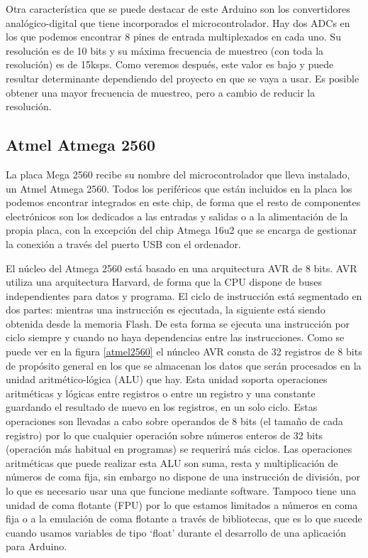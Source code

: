 Otra característica que se puede destacar de este Arduino son los convertidores analógico-digital que tiene incorporados el microcontrolador. Hay dos ADCs en los que podemos encontrar 8 pines de entrada multiplexados en cada uno. Su resolución es de 10 bits y su máxima frecuencia de muestreo (con toda la resolución) es de 15ksps. Como veremos después, este valor es bajo y puede resultar determinante dependiendo del proyecto en que se vaya a usar. Es posible obtener una mayor frecuencia de muestreo, pero a cambio de reducir la resolución.

\subsection*{ Atmel Atmega 2560}
La placa Mega 2560 recibe su nombre del microcontrolador que lleva instalado, un Atmel Atmega 2560. Todos los periféricos que están incluidos en la placa los podemos encontrar integrados en este chip, de forma que el resto de componentes electrónicos son los dedicados a las entradas y salidas o a la alimentación de la propia placa, con la excepción del chip Atmega 16u2 que se encarga de gestionar la conexión a través del puerto USB con el ordenador.

El núcleo del Atmega 2560 está basado en una arquitectura AVR de 8 bits. AVR utiliza una arquitectura Harvard, de forma que la CPU dispone de buses independientes para datos y programa. El ciclo de instrucción está segmentado en dos partes: mientras una instrucción es ejecutada, la siguiente está siendo obtenida desde la memoria Flash. De esta forma se ejecuta una instrucción por ciclo siempre y cuando no haya dependencias entre las instrucciones.
Como se puede ver en la figura \ref{atmel2560} el núncleo AVR consta de 32 registros de 8 bits de propósito general en los que se almacenan los datos que serán procesados en la unidad aritmético-lógica (ALU) que hay. Esta unidad soporta operaciones aritméticas y lógicas entre registros o entre un registro y una constante guardando el resultado de nuevo en los registros, en un solo ciclo. Estas operaciones son llevadas a cabo sobre operandos de 8 bits (el tamaño de cada registro) por lo que cualquier operación sobre números enteros de 32 bits (operación más habitual en programas) se requerirá más ciclos. Las operaciones aritméticas que puede realizar esta ALU son suma, resta y multiplicación de números de coma fija, sin embargo no dispone de una instrucción de división, por lo que es necesario usar una que funcione mediante software. Tampoco tiene una unidad de coma flotante (FPU) por lo que estamos limitados a números en coma fija o a la emulación de coma flotante a través de bibliotecas, que es lo que sucede cuando usamos variables de tipo `float' durante el desarrollo de una aplicación para Arduino.

